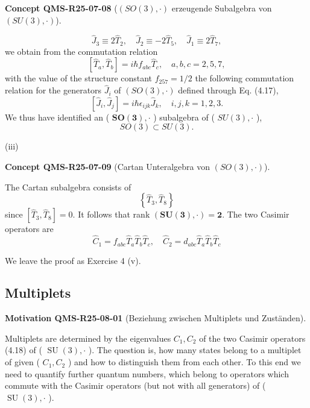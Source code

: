 \documentclass[10pt, letterpaper]{article}
\newcommand{\CustomHeading}[3]{%
  \par\medskip\noindent%
  \textbf{#1 #2} \textnormal{(#3)}.\enskip%
}
\newenvironment{CONC}[2]{\begin{unitbox}\CustomHeading{Concept}{#1}{#2}}{\end{unitbox}}
\newenvironment{MOT}[2]{\begin{unitbox}\CustomHeading{Motivation}{#1}{#2}}{\end{unitbox}}
\begin{document}
\begin{CONC}{QMS-R25-07-08}{$(S O(3), \cdot)$ erzeugende Subalgebra von $(S U(3), \cdot)$}
$$
\hat{J}_{3} \equiv 2 \hat{T}_{2}, \quad \hat{J}_{2} \equiv-2 \hat{T}_{5}, \quad \hat{J}_{1} \equiv 2 \hat{T}_{7},
$$
we obtain from the commutation relation
$$
\left[\hat{T}_{a}, \hat{T}_{b}\right]=i \hbar f_{a b c} \hat{T}_{c}, \quad a, b, c=2,5,7,
$$
with the value of the structure constant $f_{257}=1 / 2$ the following commutation relation for the generators $\hat{J}_{i}$ of $(S O(3), \cdot)$ defined through Eq. (4.17),
$$
\left[\hat{J}_{i}, \hat{J}_{j}\right]=i \hbar \epsilon_{i j k} \hat{J}_{k}, \quad i, j, k=1,2,3 .
$$
We thus have identified an ( $\boldsymbol{S O}(\mathbf{3}), \cdot$ ) subalgebra of ( $S U(3), \cdot$ ),
$$
S O(3) \subset S U(3) .
$$
\end{CONC}




(iii) 

\begin{CONC}{QMS-R25-07-09}{Cartan Unteralgebra von $(S O(3), \cdot)$}
The Cartan subalgebra consists of
$$
\left\{\hat{T}_{3}, \hat{T}_{8}\right\}
$$
since $\left[\hat{T}_{3}, \hat{T}_{8}\right]=0$. It follows that rank $(\boldsymbol{S U}(\mathbf{3}), \cdot)=\mathbf{2}$. The two Casimir operators are
$$
\hat{C}_{1}=f_{a b c} \hat{T}_{a} \hat{T}_{b} \hat{T}_{c}, \quad \hat{C}_{2}=d_{a b c} \hat{T}_{a} \hat{T}_{b} \hat{T}_{c}
$$
\end{CONC}

We leave the proof as Exercise 4 (v).


\pagebreak



\subsection{Multiplets}




\begin{MOT}{QMS-R25-08-01}{Beziehung zwischen Multiplets und Zuständen}
Multiplets are determined by the eigenvalues $C_{1}, C_{2}$ of the two Casimir operators (4.18) of ( $\operatorname{SU}(3), \cdot$ ). The question is, how many states belong to a multiplet of given ( $C_{1}, C_{2}$ ) and how to distinguish them from each other. To this end we need to quantify further quantum numbers, which belong to operators which commute with the Casimir operators (but not with all generators) of ( $\operatorname{SU}(3), \cdot$ ).
\end{MOT}
\end{document}
